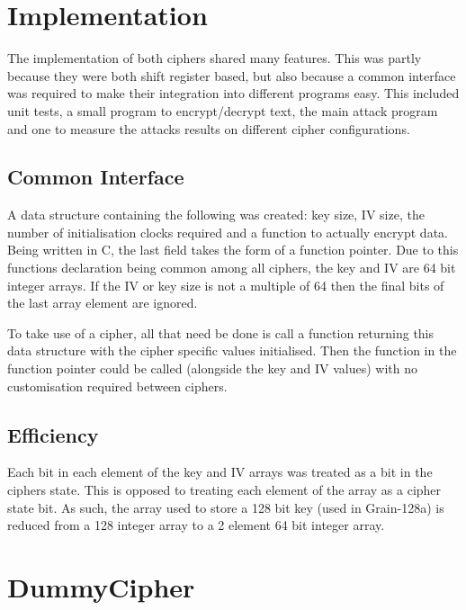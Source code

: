 \documentclass{report}
\let\Oldsection\section
\renewcommand{\section}{\FloatBarrier\Oldsection}
\let\Oldsubsection\subsection
\renewcommand{\subsection}{\FloatBarrier\Oldsubsection}
\begin{document}
\section{Implementation}
The implementation of both ciphers shared many features. This was partly because they were both shift register based, but also because a common interface was required to make their integration into different programs easy. This included unit tests, a small program to encrypt/decrypt text, the main attack program and one to measure the attacks results on different cipher configurations.

\subsection{Common Interface}
A data structure containing the following was created: key size, IV size, the number of initialisation clocks required and a function to actually encrypt data. Being written in C, the last field takes the form of a function pointer. Due to this functions declaration being common among all ciphers, the key and IV   are 64 bit integer arrays. If the IV or key size is not a multiple of 64 then the final bits of the last array element are ignored.

To take use of a cipher, all that need be done is call a function returning this data structure with the cipher specific values initialised. Then the function in the function pointer could be called (alongside the key and IV values) with no customisation required between ciphers.

\subsection{Efficiency}
Each bit in each element of the key and IV arrays was treated as a bit in the ciphers state. This is opposed to treating each element of the array as a cipher state bit. As such, the array used to store a 128 bit key (used in Grain-128a) is reduced from a 128 integer array to a 2 element 64 bit integer array.

\begin{figure}[!htb]
\end{figure}
\newpage
\section{DummyCipher}
\begin{figure}[!htb]
\end{figure}
\end{document}
